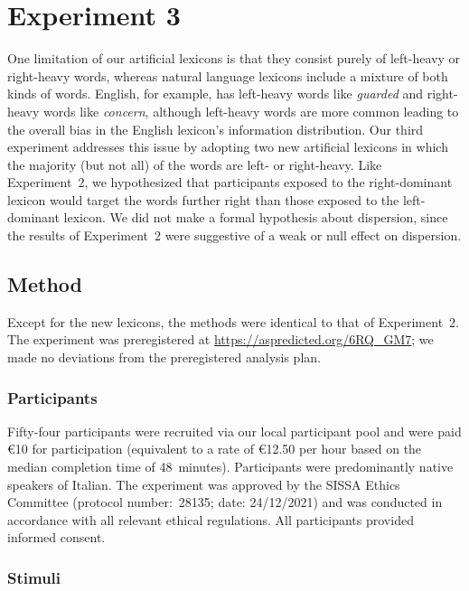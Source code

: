 \documentclass[doc,biblatex]{apa7}
\begin{document}
\section{Experiment 3}

One limitation of our artificial lexicons is that they consist purely of left-heavy or right-heavy words, whereas natural language lexicons include a mixture of both kinds of words. English, for example, has left-heavy words like \textit{guarded} and right-heavy words like \textit{concern}, although left-heavy words are more common leading to the overall bias in the English lexicon's information distribution. Our third experiment addresses this issue by adopting two new artificial lexicons in which the majority (but not all) of the words are left- or right-heavy. Like Experiment~2, we hypothesized that participants exposed to the right-dominant lexicon would target the words further right than those exposed to the left-dominant lexicon. We did not make a formal hypothesis about dispersion, since the results of Experiment~2 were suggestive of a weak or null effect on dispersion.

\subsection{Method}

Except for the new lexicons, the methods were identical to that of Experiment~2. The experiment was preregistered at \url{https://aspredicted.org/6RQ_GM7}; we made no deviations from the preregistered analysis plan.

\subsubsection{Participants}

Fifty-four participants were recruited via our local participant pool and were paid €10 for participation (equivalent to a rate of €12.50 per hour based on the median completion time of 48~minutes). Participants were predominantly native speakers of Italian. The experiment was approved by the SISSA Ethics Committee (protocol number:~28135; date: 24/12/2021) and was conducted in accordance with all relevant ethical regulations. All participants provided informed consent.

\subsubsection{Stimuli}
\end{document}
